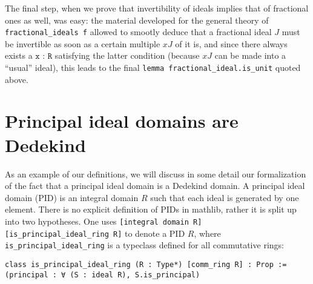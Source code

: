 \documentclass[a4paper,USenglish,cleveref, autoref, thm-restate]{lipics-v2021}
\newcommand{\lean}[1]{\texttt{#1}\xspace} %
\newcommand{\mathlib}{\textsf{mathlib}\xspace}
\begin{document}
The final step, when we prove that invertibility of ideals implies that of fractional ones as well, was easy: the material developed for the general theory of \lean{fractional\_ideals f} allowed to smootly deduce that a fractional ideal $J$ must be invertible as soon as a certain multiple $xJ$ of it is, and since there always exists a $\lean{x : R}$ satisfying the latter condition (because $xJ$ can be made into a ``usual'' ideal), this leads to the final \lean{lemma fractional\_ideal.is\_unit} quoted above.
%
\section{Principal ideal domains are Dedekind}

As an example of our definitions, we will discuss in some detail our formalization of the fact that a principal ideal domain is a Dedekind domain.
A principal ideal domain (PID) is an integral domain $R$ such that each ideal is generated by one element.
There is no explicit definition of PIDs in \mathlib, rather it is split up into two hypotheses.
One uses \lean{[integral domain R] [is\_principal\_ideal\_ring R]} to denote a PID $R$,
where \lean{is\_principal\_ideal\_ring} is a typeclass defined for all commutative rings:
\begin{lstlisting}
class is_principal_ideal_ring (R : Type*) [comm_ring R] : Prop :=
(principal : ∀ (S : ideal R), S.is_principal)
\end{lstlisting}
\end{document}
